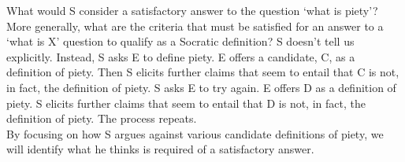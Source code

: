 \documentclass[oneside]{article}
\begin{document}

\noindent What would S consider a satisfactory answer to the question `what is piety'? More generally, what are the criteria that must be satisfied for an answer to a `what is X' question to qualify as a Socratic definition? S doesn't tell us explicitly. Instead,  S asks E to define piety. E offers a candidate, C, as a definition of piety. Then S elicits further claims that seem to entail that C is not, in fact, the definition of piety. S asks E to try again. E offers D as a definition of piety. S elicits further claims that seem to entail that D is not, in fact, the definition of piety. The process repeats.\\ 

\noindent By focusing on how S argues against various candidate definitions of piety, we will identify what he thinks is required of a satisfactory answer. 
\end{document}
